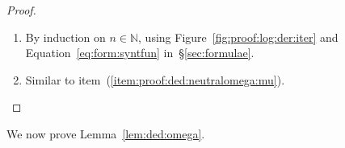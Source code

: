 \documentclass[%
  a4paper,
  UKenglish,
  cleveref,
  autoref,
  thm-restate,
  numberwithinsect,
]{lipics-v2021}
\newcommand\NN{\mathbb{N}}
\begin{document}
\begin{proof}
\hfill
\begin{enumerate}[(1)]
\item 
By induction on $n \in \NN$,
using Figure~\ref{fig:proof:log:der:iter}
and Equation~\eqref{eq:form:syntfun} in~\S\ref{sec:formulae}.

\item
Similar to item~(\ref{item:proof:ded:neutralomega:mu}).
\qedhere
\end{enumerate}
\end{proof}



We now prove Lemma~\ref{lem:ded:omega}.

\LemNeutralOmega*
\end{document}
